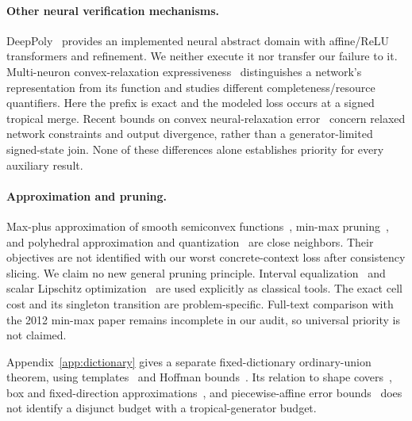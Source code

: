 \paragraph{Other neural verification mechanisms.}
DeepPoly~\cite{singh2019} provides an implemented neural abstract domain with affine/ReLU transformers and refinement. We neither execute it nor transfer our failure to it. Multi-neuron convex-relaxation expressiveness~\cite{mao2026} distinguishes a network's representation from its function and studies different completeness/resource quantifiers. Here the prefix is exact and the modeled loss occurs at a signed tropical merge. Recent bounds on convex neural-relaxation error~\cite{papamichail2026} concern relaxed network constraints and output divergence, rather than a generator-limited signed-state join. None of these differences alone establishes priority for every auxiliary result.

\paragraph{Approximation and pruning.}
Max-plus approximation of smooth semiconvex functions~\cite{gaubert2011}, min-max pruning~\cite{mceneaney2011,gaubert2012}, and polyhedral approximation and quantization~\cite{bulaich2025} are close neighbors. Their objectives are not identified with our worst concrete-context loss after consistency slicing. We claim no new general pruning principle. Interval equalization~\cite{tilli2019} and scalar Lipschitz optimization~\cite{shubert1972} are used explicitly as classical tools. The exact cell cost and its singleton transition are problem-specific. Full-text comparison with the 2012 min-max paper remains incomplete in our audit, so universal priority is not claimed.

Appendix~\ref{app:dictionary} gives a separate fixed-dictionary ordinary-union theorem, using templates~\cite{colon2011} and Hoffman bounds~\cite{pena2018}. Its relation to shape covers~\cite{alexa2021}, box and fixed-direction approximations~\cite{bemporad2004,rieger2019}, and piecewise-affine error bounds~\cite{dolgopolik2023} does not identify a disjunct budget with a tropical-generator budget.


